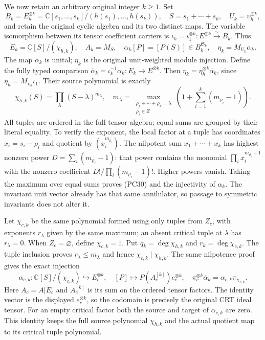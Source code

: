 We now retain an arbitrary original integer $k\ge1$.  Set
\[
 B_k=E_h^{\otimes k}
  =\mathbb C[s_1,\ldots,s_k]/(h(s_1),\ldots,h(s_k)),\quad
 S=s_1+\cdots+s_k,\quad U_k=\upsilon_h^{\otimes k},
 \tag{PC28}
\]
and retain the original cyclic algebra and its two distinct maps.
The variable isomorphism between its tensor coefficient carriers is
$\iota_k=\iota_1^{\otimes k}:E^{\otimes k}\xrightarrow{\sim}B_k$.
Thus
\[
 E_k=\mathbb C[S]/(\chi_{h,k}),\quad A_k=M_S,\quad
 \alpha_k[P]=[P(S)]\in B_k^{\mathfrak S_k},\quad
 \eta_k=M_{U_k}\alpha_k.
 \tag{PC29}
\]
The map $\alpha_k$ is unital; $\eta_k$ is the original unit-weighted
module injection.  Define the fully typed comparison
$\overline\alpha_k=\iota_k^{-1}\alpha_k:E_k\to E^{\otimes k}$.
Then $\eta_k=\eta_h^{\otimes k}\overline\alpha_k$, since
$\eta_h=M_{\upsilon_h}\iota_1$.  Their source polynomial is exactly
\[
 \chi_{h,k}(S)=\prod_\lambda(S-\lambda)^{m_\lambda},\quad
 m_\lambda=\max_{\substack{\rho_1+\cdots+\rho_k=\lambda\\\rho_i\in Z}}
          \left(1+\sum_{i=1}^k(m_{\rho_i}-1)\right).
 \tag{PC30}
\]
All tuples are ordered in the full tensor algebra; equal sums are
grouped by their literal equality.  To verify the exponent, the local
factor at a tuple has coordinates $x_i=s_i-\rho_i$ and quotient
by $(x_i^{m_{\rho_i}})$.  The nilpotent sum
$x_1+\cdots+x_k$ has highest nonzero power
$D=\sum_i(m_{\rho_i}-1)$: that power contains the monomial
$\prod_i x_i^{m_{\rho_i}-1}$ with the nonzero coefficient
$D!/\prod_i(m_{\rho_i}-1)!$.  Higher powers vanish.  Taking the
maximum over equal sums proves (PC30) and the injectivity of
$\alpha_k$.  The invariant unit vector already has that same
annihilator, so passage to symmetric invariants does not alter it.

Let $\chi_{c,k}$ be the same polynomial formed using only tuples
from $Z_c$, with exponents $r_\lambda$ given by the same maximum;
an absent critical tuple at $\lambda$ has $r_\lambda=0$.
When $Z_c=\varnothing$, define $\chi_{c,k}=1$.  Put
$q_k=\deg\chi_{h,k}$ and $r_k=\deg\chi_{c,k}$.
The tuple inclusion proves $r_\lambda\le m_\lambda$ and hence
$\chi_{c,k}\mid\chi_{h,k}$.  The same nilpotence proof gives
the exact injection
\[
 \alpha_{c,k}:\mathbb C[S]/(\chi_{c,k})
                  \hookrightarrow E_c^{\otimes k},\quad
 [P]\mapsto P(A_c^{[k]})e_c^{\otimes k},
 \quad
 \pi_c^{\otimes k}\overline\alpha_k=
          \alpha_{c,k}\pi_{\chi_{c,k}}.
 \tag{PC31}
\]
Here $A_c=A|E_c$ and $A_c^{[k]}$ is its sum on the ordered
tensor factors.  The identity vector is the displayed $e_c^{\otimes k}$,
so the codomain is precisely the original CRT ideal tensor.
For an empty critical factor both the source and target of
$\alpha_{c,k}$ are zero.  This identity keeps the full source
polynomial $\chi_{h,k}$ and the actual quotient map to its critical
tuple polynomial.

